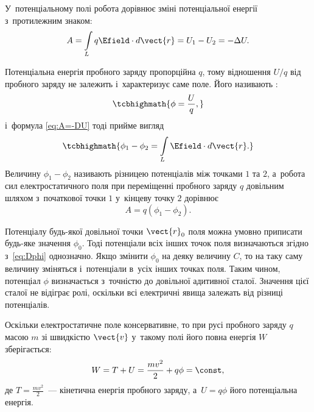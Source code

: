 У~потенціальному полі робота дорівнює зміні потенціальної енергії з~протилежним знаком:
\begin{equation}\label{eq:A=-DU}
	A = \int\limits_L q\Efield \cdot d\vect{r} = U_1 - U_2 = - \Delta U.
\end{equation}

Потенціальна енергія пробного заряду пропорційна $q$, тому відношення $U/q$ від пробного
заряду не залежить і~характеризує саме поле. Його називають
:
\begin{equation}
	\tcbhighmath{\phi = \frac{U}{q},}
\end{equation}
і~формула \eqref{eq:A=-DU} тоді прийме вигляд
\begin{equation}\label{eq:Dphi}
	\tcbhighmath{\phi_1 - \phi_2 = \int\limits_L \Efield \cdot d\vect{r}.}
\end{equation}
Величину $\phi_1 - \phi_2$ називають різницею потенціалів між точками $1$ та $2$, а~робота
сил електростатичного поля при переміщенні пробного заряду $q$ довільним шляхом
з~початкової точки $1$ у~кінцеву точку $2$ дорівнює
\begin{equation}
	A = q(\phi_1 - \phi_2).
\end{equation}

Потенціалу будь-якої довільної точки $\vect{r}_0$ поля можна умовно приписати будь-яке
значення $\phi_0$. Тоді потенціали всіх інших точок поля визначаються згідно
з~\eqref{eq:Dphi} однозначно. Якщо змінити $\phi_0$ на деяку величину $C$, то на таку саму
величину зміняться і~потенціали в~усіх інших точках поля. Таким чином, потенціал $\phi$
визначається з~точністю до довільної адитивної сталої. Значення цієї сталої не
відіграє ролі, оскільки всі електричні явища залежать від різниці потенціалів.

Оскільки електростатичне поле консервативне, то при русі пробного заряду $q$ масою $m$ зі
швидкістю $\vect{v}$ у~такому полі його повна енергія $W$ зберігається:
\begin{equation}
	W = T + U = \frac{mv^2}{2} + q\phi = \const,
\end{equation}
де $T = \frac{mv^2}{2}$~--- кінетична енергія пробного заряду, а~$U = q\phi$ його
потенціальна енергія.

